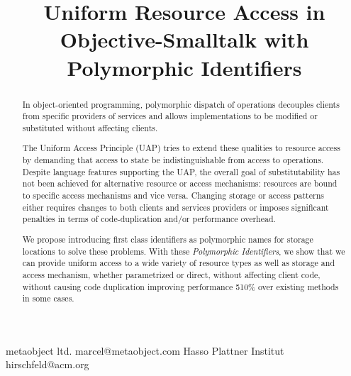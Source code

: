 \documentclass[preprint]{sigplanconf}
\begin{document}

\linespread{0.9}

\copyrightdata{[to be supplied]} 



\title{Uniform Resource Access in Objective-Smalltalk with Polymorphic Identifiers}



           {metaobject ltd.}
           {marcel@metaobject.com}
           {Hasso Plattner Institut}
           {hirschfeld@acm.org}


\maketitle

\begin{abstract}

In object-oriented programming, polymorphic dispatch of operations
decouples clients from specific providers of services and allows 
implementations to be modified or substituted without affecting clients. 

The Uniform Access Principle (UAP) tries to extend these qualities to 
resource access by demanding that access to state be indistinguishable
from access to operations.  Despite language features supporting the
UAP, the overall goal of substitutability has not been achieved for
alternative resource or access mechanisms:    
resources are bound to specific 
access mechanisms and vice versa.  Changing storage or 
access patterns either requires changes to both clients and
services providers or imposes significant penalties in terms of
code-duplication and/or performance overhead.

We propose introducing first class identifiers as polymorphic names for storage locations
to solve these problems.  With these \emph{Polymorphic Identifiers}, we show that
we can provide uniform access to a wide variety of resource types as well as 
storage and access mechanism, whether parametrized or direct, without affecting
client code, without causing code duplication improving performance  510\%
over existing methods in some cases.

\end{abstract}
\end{document}
